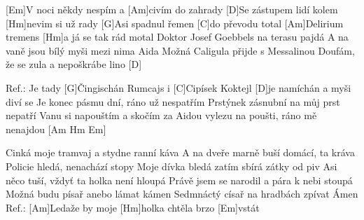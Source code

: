 
[Em]V noci někdy nespím a [Am]civím do zahrady
[D]Se zástupem lidí kolem [Hm]nevim si už rady
[G]Asi spadnul řemen [C]do převodu total
[Am]Delirium tremens [Hm]a já se tak rád motal
Doktor Josef Goebbels na terasu pajdá
A na vaně jsou bílý myši mezi nima Aida
Možná Caligula přijde s Messalinou
Doufám, že se zula a nepoškrábe lino [D]


Ref.: Je tady [G]\null Čingischán Rumcajs i [C]Cipísek
Koktejl [D]je namíchán a myši diví se
Je konec pásmu dní, ráno už nespatřím
Prstýnek zásnubní na můj prst nepatří
Vanu si napouštím a skočím za Aidou
vylezu na poušti,
ráno mě nenajdou [Am Hm Em]

Cinká moje tramvaj a stydne ranní káva
A na dveře marně buší domácí, ta kráva
Policie hledá, nenachází stopy
Moje dívka bledá zatím sbírá zátky od piv
Asi něco tuší, vždyť ta holka není hloupá
Právě jsem se narodil a pára k nebi stoupá
Možná budu písař anebo lámat kámen
Sedmnáctý císař na hradbách zpívat Ámen
Ref.: 
[Am]Ledaže by moje [Hm]holka chtěla brzo [Em]vstát